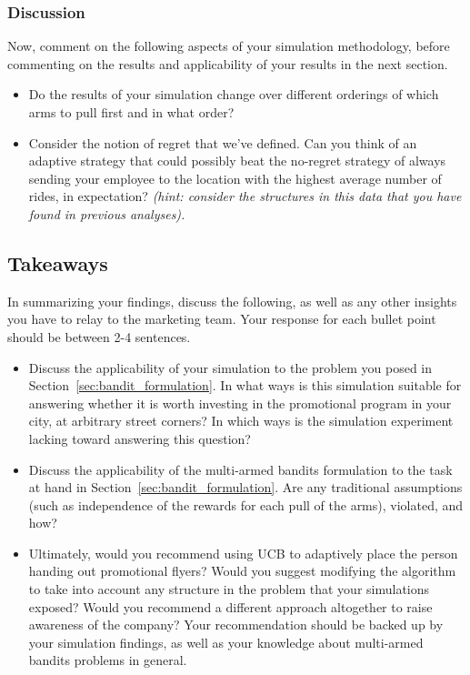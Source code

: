 \documentclass[12pt, answers, addpoints]{exam}
\begin{document}
\subsubsection{Discussion}
Now, comment on the following aspects of your simulation methodology, before commenting on the results and applicability of your results in the next section.
\begin{itemize}
    \item Do the results of your simulation change over different orderings of which arms to pull first and in what order? 
    \item Consider the notion of regret that we've defined. Can you think of an adaptive strategy that could possibly beat the no-regret strategy of always sending your employee to the location with the highest average number of rides, in expectation? \emph{(hint: consider the structures in this data that you  have found in previous analyses). }
\end{itemize}

\subsection{Takeaways}
In summarizing your findings, discuss the following, as well as any other insights you have to relay to the marketing team. Your response for each bullet point should be between 2-4 sentences. 
\begin{itemize}
    \item Discuss the applicability of your simulation to the problem you posed in Section~\ref{sec:bandit_formulation}. In what ways is this simulation suitable for answering whether it is worth investing in the promotional program in your city, at arbitrary street corners? In which ways is the simulation experiment lacking toward answering this question?
    \item Discuss the applicability of the multi-armed bandits formulation to the task at hand in Section~\ref{sec:bandit_formulation}. Are any traditional assumptions (such as independence of the rewards for each pull of the arms), violated, and how? 
    \item Ultimately, would you recommend using UCB to adaptively place the person handing out promotional flyers? Would you suggest modifying the algorithm to take into account any structure in the problem that your simulations exposed? Would you recommend a different approach altogether to raise awareness of the company? Your recommendation should be backed up by your simulation findings, as well as your knowledge about multi-armed bandits problems in general.
\end{itemize}
\end{document}
